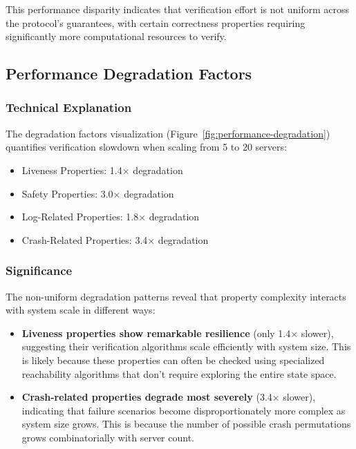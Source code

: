 This performance disparity indicates that verification effort is not uniform across the protocol's guarantees, with certain correctness properties requiring significantly more computational resources to verify.

\subsection{Performance Degradation Factors}

\subsubsection{Technical Explanation}

The degradation factors visualization (Figure~\ref{fig:performance-degradation}) quantifies verification slowdown when scaling from 5 to 20 servers:

\begin{itemize}
    \item Liveness Properties: 1.4$\times$ degradation
    \item Safety Properties: 3.0$\times$ degradation
    \item Log-Related Properties: 1.8$\times$ degradation
    \item Crash-Related Properties: 3.4$\times$ degradation
\end{itemize}

\subsubsection{Significance}

The non-uniform degradation patterns reveal that property complexity interacts with system scale in different ways:

\begin{itemize}
    \item \textbf{Liveness properties show remarkable resilience} (only 1.4$\times$ slower), suggesting their verification algorithms scale efficiently with system size. This is likely because these properties can often be checked using specialized reachability algorithms that don't require exploring the entire state space.
    
    \item \textbf{Crash-related properties degrade most severely} (3.4$\times$ slower), indicating that failure scenarios become disproportionately more complex as system size grows. This is because the number of possible crash permutations grows combinatorially with server count.
\end{itemize}

